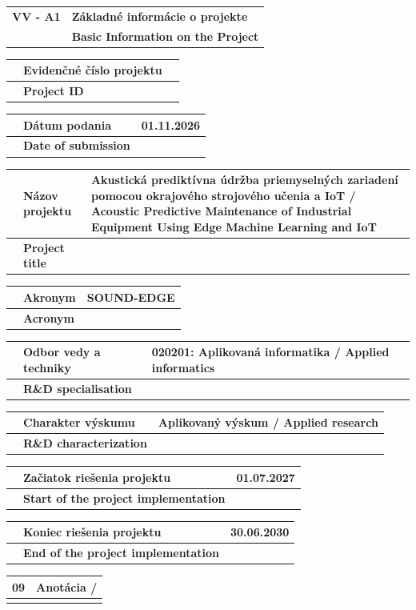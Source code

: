 \documentclass[9pt,a4paper]{extarticle}
\newcommand{\SecHead}[3]{\par\needspace{45pt}\vspace{7pt}\noindent
\begin{tabularx}{\textwidth}{|>{\bfseries\centering\arraybackslash}p{18mm}|X|}
\hline\cellcolor{shade}#1 & \cellcolor{shade}\hfill\bfseries #2 \\ \cellcolor{shade} & \cellcolor{shade}\hfill\bfseries #3 \\ \hline
\end{tabularx}\vspace{3pt}\par}
\newcommand{\Field}[4]{\noindent\begin{tabularx}{\textwidth}{|>{\centering\arraybackslash}p{7mm}|>{\columncolor{shade}}p{59mm}|X|}\hline
\multirowdummy{#1} & \textbf{#2} & \multirowdummy{#4} \\ \cline{2-2}
& \textbf{#3} & \\ \hline\end{tabularx}\par\vspace{-1pt}}
\newcommand{\multirowdummy}[1]{#1}
\newcommand{\WideField}[4]{\noindent\begin{tabularx}{\textwidth}{|>{\columncolor{shade}}p{7mm}|>{\columncolor{shade}}X|}\hline
#1 & \textbf{#2} / #3 \\ \hline\multicolumn{2}{|p{\dimexpr\textwidth-2\tabcolsep-2\arrayrulewidth\relax}|}{#4}\\\hline\end{tabularx}\par\vspace{-1pt}}
\begin{document}
\SecHead{VV - A1}{Základné informácie o projekte}{Basic Information on the Project}
\Field{01}{Evidenčné číslo projektu}{Project ID}{}
\Field{02}{Dátum podania}{Date of submission}{01.11.2026}
\Field{03}{Názov projektu}{Project title}{Akustická prediktívna údržba priemyselných zariadení pomocou okrajového strojového učenia a IoT / Acoustic Predictive Maintenance of Industrial Equipment Using Edge Machine Learning and IoT}
\Field{04}{Akronym}{Acronym}{SOUND-EDGE}
\Field{05}{Odbor vedy a techniky}{R\&D specialisation}{020201: Aplikovaná informatika / Applied informatics}
\Field{06}{Charakter výskumu}{R\&D characterization}{Aplikovaný výskum / Applied research}
\Field{07}{Začiatok riešenia projektu}{Start of the project implementation}{01.07.2027}
\Field{08}{Koniec riešenia projektu}{End of the project implementation}{30.06.2030}
\WideField{09}{Anotácia}{}{Projekt SOUND-EDGE sa zameriava na výskum a vývoj inovatívneho systému prediktívnej údržby pre rotujúce stroje (motory, ložiská) v prostredí Priemyslu 4.0. Tradičné prístupy vyžadujú odosielanie veľkého množstva surových senzorových dát (napríklad vibrácií a akustických signálov) do cloudových úložísk. Tento prístup spôsobuje vysokú latenciu, enormnú spotrebu sieťového pásma a potenciálne bezpečnostné riziká. Komerčné riešenia sú navyše pre mnohé malé a stredné podniky finančne nákladné.

Tento projekt rieši spomenuté problémy využitím technológie TinyML (okrajové strojové učenie -- Edge AI). Hlavným cieľom je navrhnúť architektúru a optimalizované softvérové modely hlbokých neurónových sietí, ktoré sú prispôsobené pre analýzu akustických a vibračných signálov priamo v prostredí nízkonákladových, energeticky obmedzených IoT zariadení. Spracovanie dát priamo na okraji siete výrazne znižuje spotrebu energie spojenú s bezdrôtovým prenosom dát, znižuje latenciu a zvyšuje celkovú bezpečnosť systému. Cloudové služby budú v navrhovanej architektúre využité výhradne na agregáciu sumárnych štatistík anomálií, čím sa minimalizuje objem prenášaných dát.

Hlavným výstupom projektu bude návrh softvérovej architektúry a model TinyML algoritmu, ktorý bude simulačne overený a vyhodnotený na dostupných benchmarkových priemyselných datasetoch. Pre overenie vlastností navrhovaného algoritmického riešenia budú v rámci simulačných experimentov použité štandardné súbory dát, predovšetkým dataset NASA IMS (Bearing Data Set), ktorý obsahuje kontinuálne záznamy vibrácií až do štádia zlyhania ložiska. Výskum zabezpečí posun z teoretického konceptu do fázy softvérovo overeného riešenia. Navrhnutá metodika a simulačné experimenty preukážu schopnosť systému včasne detegovať mikroskopické poruchy, čo podnikom poskytne overený základ pre znižovanie nákladov na údržbu a predlžovanie životnosti výrobných zariadení.}
\end{document}
